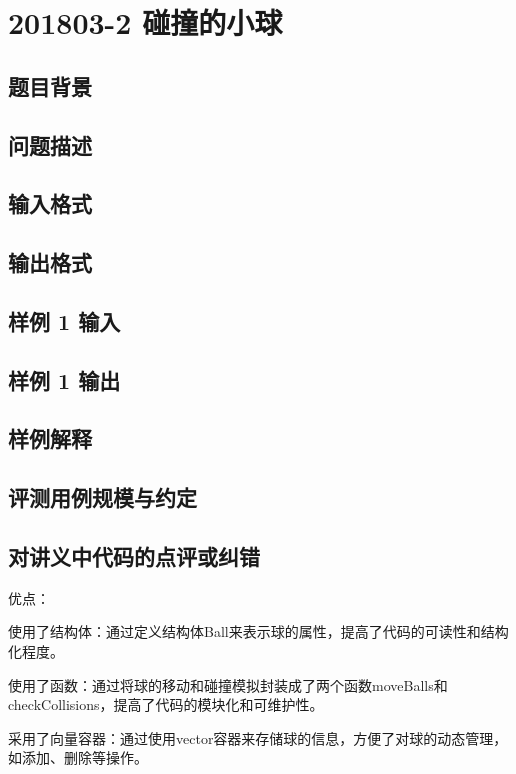 \section{201803-2 碰撞的小球}

\subsection{题目背景}

\subsection{问题描述}

\subsection{输入格式}

\subsection{输出格式}

\subsection{样例 1 输入}

\subsection{样例 1 输出}

\subsection{样例解释}

\subsection{评测用例规模与约定}

\subsection{对讲义中代码的点评或纠错}
 
优点：

使用了结构体：通过定义结构体Ball来表示球的属性，提高了代码的可读性和结构化程度。

使用了函数：通过将球的移动和碰撞模拟封装成了两个函数moveBalls和checkCollisions，提高了代码的模块化和可维护性。

采用了向量容器：通过使用vector容器来存储球的信息，方便了对球的动态管理，如添加、删除等操作。

